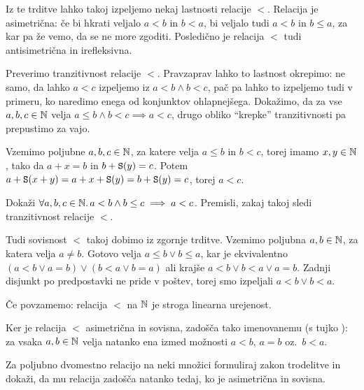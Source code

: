 Iz te trditve lahko takoj izpeljemo nekaj lastnosti relacije $<$. Relacija je asimetrična: če bi hkrati veljalo $a < b$ in $b < a$, bi veljalo tudi $a < b$ in $b \leq a$, za kar pa že vemo, da se ne more zgoditi. Posledično je relacija $<$ tudi antisimetrična in irefleksivna. 

Preverimo tranzitivnost relacije $<$. Pravzaprav lahko to lastnost okrepimo: ne samo, da lahko $a < c$ izpeljemo iz $a < b \land b < c$, pač pa lahko to izpeljemo tudi v primeru, ko naredimo enega od konjunktov ohlapnejšega. Dokažimo, da za vse $a, b, c \in \mathbb{N}$ velja $a \leq b \land b < c \implies a < c$, drugo obliko ``krepke'' tranzitivnosti pa prepustimo za vajo.

Vzemimo poljubne $a, b, c \in \mathbb{N}$, za katere velja $a \leq b$ in $b < c$, torej imamo $x, y \in \mathbb{N}$, tako da $a + x = b$ in $b + \mathtt{S}(y) = c$. Potem $a + \mathtt{S}(x + y) = a + x + \mathtt{S}(y) = b + \mathtt{S}(y) = c$, torej $a < c$.

\begin{naloga}
Dokaži $\forall a, b, c \in \mathbb{N} .\,{a < b \land b \leq c \implies a < c}$. Premisli, zakaj takoj sledi tranzitivnost relacije $<$.
\end{naloga}

Tudi sovisnost $<$ takoj dobimo iz zgornje trditve. Vzemimo poljubna $a, b \in \mathbb{N}$, za katera velja $a \neq b$. Gotovo velja $a \leq b \lor b \leq a$, kar je ekvivalentno $(a < b \lor a = b) \lor (b < a \lor b = a)$ ali krajše $a < b \lor b < a \lor a = b$. Zadnji disjunkt po predpostavki ne pride v poštev, torej smo izpeljali $a < b \lor b < a$.

Če povzamemo: relacija $<$ na $\mathbb{N}$ je stroga linearna urejenost.

Ker je relacija $<$ asimetrična in sovisna, zadošča tako imenovanemu  (s tujko ): za vsaka $a, b \in \mathbb{N}$ velja natanko ena izmed možnosti $a < b$, $a = b$ oz.~$b < a$.

\begin{naloga}
Za poljubno dvomestno relacijo na neki množici formuliraj zakon trodelitve in dokaži, da mu relacija zadošča natanko tedaj, ko je asimetrična in sovisna.
\end{naloga}


